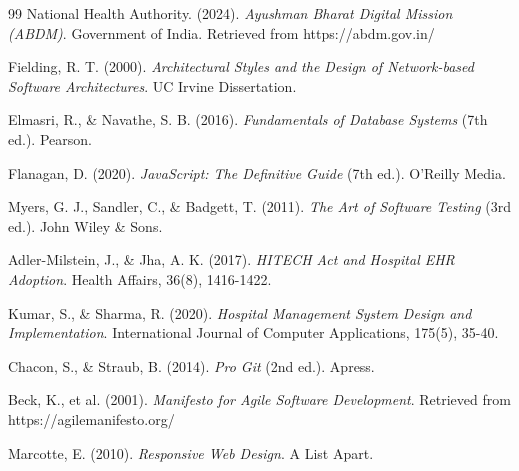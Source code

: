 \begin{thebibliography}{99}
National Health Authority. (2024). \textit{Ayushman Bharat Digital Mission (ABDM)}. Government of India. Retrieved from https://abdm.gov.in/

Fielding, R. T. (2000). \textit{Architectural Styles and the Design of Network-based Software Architectures}. UC Irvine Dissertation.

Elmasri, R., \& Navathe, S. B. (2016). \textit{Fundamentals of Database Systems} (7th ed.). Pearson.

Flanagan, D. (2020). \textit{JavaScript: The Definitive Guide} (7th ed.). O'Reilly Media.

Myers, G. J., Sandler, C., \& Badgett, T. (2011). \textit{The Art of Software Testing} (3rd ed.). John Wiley \& Sons.

Adler-Milstein, J., \& Jha, A. K. (2017). \textit{HITECH Act and Hospital EHR Adoption}. Health Affairs, 36(8), 1416-1422.

Kumar, S., \& Sharma, R. (2020). \textit{Hospital Management System Design and Implementation}. International Journal of Computer Applications, 175(5), 35-40.

Chacon, S., \& Straub, B. (2014). \textit{Pro Git} (2nd ed.). Apress.

Beck, K., et al. (2001). \textit{Manifesto for Agile Software Development}. Retrieved from https://agilemanifesto.org/

Marcotte, E. (2010). \textit{Responsive Web Design}. A List Apart.

\end{thebibliography}